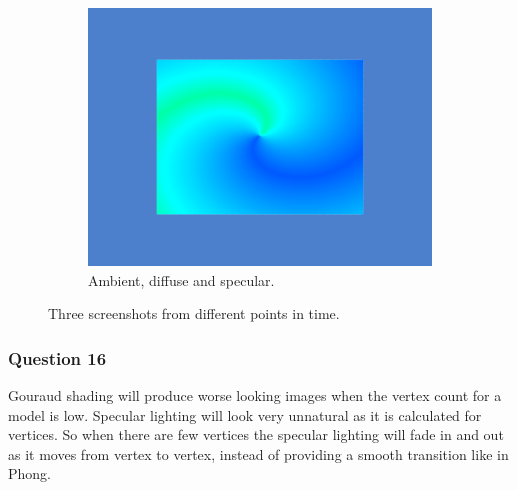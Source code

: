 \documentclass[a4paper]{article}
\begin{document}
\begin{figure}[H]
\begin{subfigure}{.32\linewidth}
            \includegraphics[width=\linewidth]{specular}
            \caption{Ambient, diffuse and specular.}
        \end{subfigure}
        \caption{Three screenshots from different points in time.}
        \label{fig:lighting}
    \end{figure}

\subsubsection*{Question 16}

    Gouraud shading will produce worse looking images when the vertex count for
    a model is low. Specular lighting will look very unnatural as it is
    calculated for vertices. So when there are few vertices the specular
    lighting will fade in and out as it moves from vertex to vertex, instead of
    providing a smooth transition like in Phong.
\end{document}
